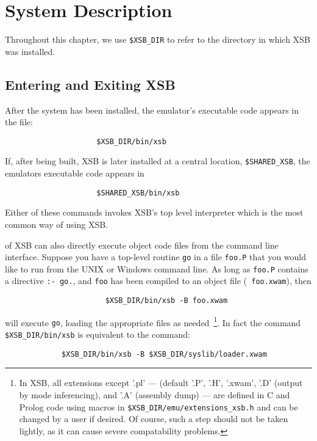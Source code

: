 \chapter{System Description} \label{chap:system}
\label{system}


Throughout this chapter, we use \verb'$XSB_DIR' to refer to the
directory in which XSB was installed.

\section{Entering and Exiting XSB}

After the system has been installed, the emulator's executable code appears 
in the file:
\begin{verbatim}
                     $XSB_DIR/bin/xsb
\end{verbatim}
If, after being built, XSB is later installed  at a central location,
\verb'$SHARED_XSB', the emulators executable code appears in
\begin{verbatim}
                     $SHARED_XSB/bin/xsb
\end{verbatim}
Either of these commands invokes XSB's top level interpreter which is
the most common way of using XSB.

\version{} of XSB can also directly execute object code files from the
command line interface.  Suppose you have a top-level routine {\tt go}
in a file {\tt foo.P} that you would like to run from the UNIX or
Windows command line.  As long as {\tt foo.P} contains a directive
{\tt :- go.}, and {\tt foo} has been compiled to an object file ({\tt
foo.xwam}), then
\begin{verbatim}
                       $XSB_DIR/bin/xsb -B foo.xwam
\end{verbatim}
will execute {\tt go}, loading the appropriate files as
needed~\footnote{In XSB, all extensions except '.pl' --- (default
'.P', '.H', '.xwam', '.D' (output by mode inferencing), and '.A'
(assembly dump) --- are defined in C and Prolog code using macros in
{\tt \$XSB\_DIR/emu/extensions\_xsb.h} and can be changed by a user if
desired.  Of course, such a step should not be taken lightly, as it
can cause severe compatability problems.}.
%
In fact the command
\verb'$XSB_DIR/bin/xsb' is equivalent to the command:
\begin{verbatim}
             $XSB_DIR/bin/xsb -B $XSB_DIR/syslib/loader.xwam
\end{verbatim}

